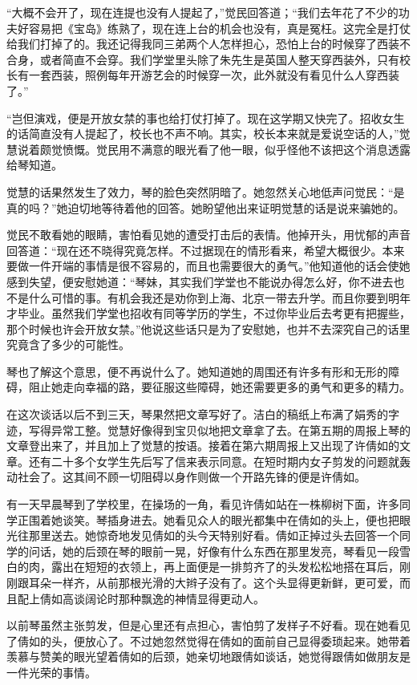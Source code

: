\par “大概不会开了，现在连提也没有人提起了，”觉民回答道；“我们去年花了不少的功夫好容易把《宝岛》练熟了，现在连上台的机会也没有，真是冤枉。这完全是打仗给我们打掉了的。我还记得我同三弟两个人怎样担心，恐怕上台的时候穿了西装不合身，或者简直不会穿。我们学堂里头除了朱先生是英国人整天穿西装外，只有校长有一套西装，照例每年开游艺会的时候穿一次，此外就没有看见什么人穿西装了。”
\par “岂但演戏，便是开放女禁的事也给打仗打掉了。现在这学期又快完了。招收女生的话简直没有人提起了，校长也不声不响。其实，校长本来就是爱说空话的人，”觉慧说着颇觉愤慨。觉民用不满意的眼光看了他一眼，似乎怪他不该把这个消息透露给琴知道。
\par 觉慧的话果然发生了效力，琴的脸色突然阴暗了。她忽然关心地低声问觉民：“是真的吗？”她迫切地等待着他的回答。她盼望他出来证明觉慧的话是说来骗她的。
\par 觉民不敢看她的眼睛，害怕看见她的遭受打击后的表情。他掉开头，用忧郁的声音回答道：“现在还不晓得究竟怎样。不过据现在的情形看来，希望大概很少。本来要做一件开端的事情是很不容易的，而且也需要很大的勇气。”他知道他的话会使她感到失望，便安慰她道：“琴妹，其实我们学堂也不能说办得怎么好，你不进去也不是什么可惜的事。有机会我还是劝你到上海、北京一带去升学。而且你要到明年才毕业。虽然我们学堂也招收有同等学历的学生，不过你毕业后去考更有把握些，那个时候也许会开放女禁。”他说这些话只是为了安慰她，也并不去深究自己的话里究竟含了多少的可能性。
\par 琴也了解这个意思，便不再说什么了。她知道她的周围还有许多有形和无形的障碍，阻止她走向幸福的路，要征服这些障碍，她还需要更多的勇气和更多的精力。
\par 在这次谈话以后不到三天，琴果然把文章写好了。洁白的稿纸上布满了娟秀的字迹，写得异常工整。觉慧好像得到宝贝似地把文章拿了去。在第五期的周报上琴的文章登出来了，并且加上了觉慧的按语。接着在第六期周报上又出现了许倩如的文章。还有二十多个女学生先后写了信来表示同意。在短时期内女子剪发的问题就轰动社会了。这其间不顾一切阻碍以身作则做一个开路先锋的便是许倩如。
\par 有一天早晨琴到了学校里，在操场的一角，看见许倩如站在一株柳树下面，许多同学正围着她谈笑。琴插身进去。她看见众人的眼光都集中在倩如的头上，便也把眼光往那里送去。她惊奇地发见倩如的头今天特别好看。倩如正掉过头去回答一个同学的问话，她的后颈在琴的眼前一晃，好像有什么东西在那里发亮，琴看见一段雪白的肉，露出在短短的衣领上，再上面便是一排剪齐了的头发松松地搭在耳后，刚刚跟耳朵一样齐，从前那根光滑的大辫子没有了。这个头显得更新鲜，更可爱，而且配上倩如高谈阔论时那种飘逸的神情显得更动人。
\par 以前琴虽然主张剪发，但是心里还有点担心，害怕剪了发样子不好看。现在她看见了倩如的头，便放心了。不过她忽然觉得在倩如的面前自己显得委琐起来。她带着羡慕与赞美的眼光望着倩如的后颈，她亲切地跟倩如谈话，她觉得跟倩如做朋友是一件光荣的事情。
